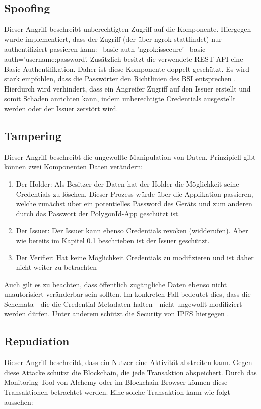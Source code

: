 \subsection{Spoofing}
\label{Spoofing}
Dieser Angriff beschreibt unberechtigten Zugriff auf die Komponente. Hiergegen wurde implementiert, dass der Zugriff (der über ngrok stattfindet) nur authentifiziert passieren kann: --basic-auth 'ngrok:issecure' --basic-auth='username:password'. Zusätzlich besitzt die verwendete REST-API eine Basic-Authentifikation. Daher ist diese Komponente doppelt geschützt. Es wird stark empfohlen, dass die Passwörter den Richtlinien des BSI entsprechen \cite{ID60}. Hierdurch wird verhindert, dass ein Angreifer Zugriff auf den Issuer erstellt und somit Schaden anrichten kann, indem unberechtigte Credentials ausgestellt werden oder der Issuer zerstört wird.

\subsection{Tampering}
Dieser Angriff beschreibt die ungewollte Manipulation von Daten. Prinzipiell gibt können zwei Komponenten Daten verändern:
\begin{enumerate}
	\item Der Holder: Als Besitzer der Daten hat der Holder die Möglichkeit seine Credentials zu löschen. Dieser Prozess würde über die Applikation passieren, welche zunächst über ein potentielles Password des Geräts und zum anderen durch das Passwort der PolygonId-App geschützt ist.
	\item Der Issuer: Der Issuer kann ebenso Credentials revoken (widderufen). Aber wie bereits im Kapitel \ref{Spoofing} beschrieben ist der Issuer geschützt.
	\item Der Verifier: Hat keine Möglichkeit Credentials zu modifizieren und ist daher nicht weiter zu betrachten
\end{enumerate}
Auch gilt es zu beachten, dass öffentlich zugängliche Daten ebenso nicht unautorisiert veränderbar sein sollten. Im konkreten Fall bedeutet dies, dass die Schemata - die die Credential Metadaten halten - nicht ungewollt modifiziert werden dürfen. Unter anderem schützt die Security von IPFS hiergegen \cite{ID65}.

\subsection{Repudiation}
\label{Repudiation}
Dieser Angriff beschreibt, dass ein Nutzer eine Aktivität abstreiten kann. Gegen diese Attacke schützt die Blockchain, die jede Transaktion abspeichert. Durch das Monitoring-Tool von Alchemy oder im Blockchain-Browser können diese Transaktionen betrachtet werden. Eine solche Transaktion kann wie folgt aussehen:


